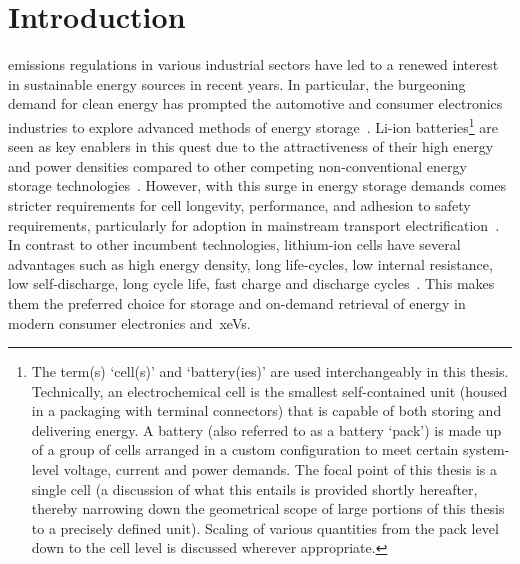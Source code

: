 
\graphicspath{{chapters/introduction/figures/}}
\clearpage
\chapter{Introduction}\label{ch:intro}
\startcontents[chapters]

\bigskip

 emissions  regulations in various  industrial sectors
have led  to a renewed interest  in sustainable energy sources  in recent years.
In  particular,  the  burgeoning  demand  for  clean  energy  has  prompted  the
automotive and  consumer electronics industries  to explore advanced  methods of
energy storage~\cite{Weiss2011}. Li-ion batteries\footnote{The term(s) `cell(s)'
and  `battery(ies)' are  used interchangeably  in this  thesis. Technically,  an
electrochemical cell is the smallest  self-contained unit (housed in a packaging
with terminal connectors) that is capable of both storing and delivering energy.
A battery (also referred to as a battery  `pack') is made up of a group of cells
arranged  in  a  custom  configuration to  meet  certain  system-level  voltage,
current and  power demands.  The focal  point of  this thesis  is a  single cell
(a  discussion of  what  this  entails is  provided  shortly hereafter,  thereby
narrowing  down the  geometrical scope  of large  portions of  this thesis  to a
precisely defined unit). Scaling of various  quantities from the pack level down
to  the  cell  level  is  discussed  wherever  appropriate.}  are  seen  as  key
enablers  in this  quest due  to  the attractiveness  of their  high energy  and
power  densities compared  to  other competing  non-conventional energy  storage
technologies~\cite{Ibrahim2008}.  However, with  this  surge  in energy  storage
demands  comes  stricter  requirements  for  cell  longevity,  performance,  and
adhesion  to  safety  requirements,  particularly  for  adoption  in  mainstream
transport  electrification~\cite{Andrea2010}.  In  contrast to  other  incumbent
technologies,  lithium-ion cells  have several  advantages such  as high  energy
density,  long life-cycles,  low internal  resistance, low  self-discharge, long
cycle life,  fast charge  and discharge  cycles~\cite{Reddy2011,Plett2015}. This
makes them the preferred choice for storage and on-demand retrieval of energy in
modern consumer electronics and~\glspl{xeV}.

